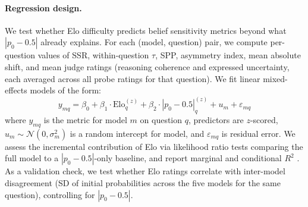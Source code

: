 \documentclass[11pt]{article}
\begin{document}
\paragraph{Regression design.}
We test whether Elo difficulty predicts belief sensitivity metrics beyond what $|p_0 - 0.5|$ already explains.
For each (model, question) pair, we compute per-question values of SSR, within-question $\tau$, SPP, asymmetry index, mean absolute shift, and mean judge ratings (reasoning coherence and expressed uncertainty, each averaged across all probe ratings for that question).
We fit linear mixed-effects models of the form:
\begin{equation}
    y_{mq} = \beta_0 + \beta_1 \cdot \text{Elo}_q^{(z)} + \beta_2 \cdot |p_0 - 0.5|_q^{(z)} + u_m + \varepsilon_{mq}
\end{equation}
where $y_{mq}$ is the metric for model $m$ on question $q$, predictors are $z$-scored, $u_m \sim \mathcal{N}(0, \sigma_m^2)$ is a random intercept for model, and $\varepsilon_{mq}$ is residual error.
We assess the incremental contribution of Elo via likelihood ratio tests comparing the full model to a $|p_0 - 0.5|$-only baseline, and report marginal and conditional $R^2$ \cite{nakagawa2013general}.
As a validation check, we test whether Elo ratings correlate with inter-model disagreement (SD of initial probabilities across the five models for the same question), controlling for $|p_0 - 0.5|$.

%



\end{document}
